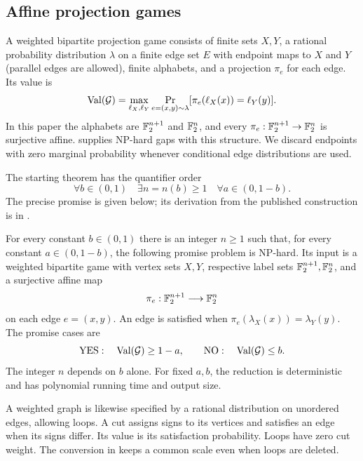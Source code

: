 \subsection{Affine projection games}

A weighted bipartite projection game consists of finite sets $X,Y$, a
rational probability distribution $\lambda$ on a finite edge set
$E$ with endpoint maps to $X$ and $Y$ (parallel edges are allowed), finite alphabets,
and a projection $\pi_e$ for each edge. Its value is
\[
 \operatorname{Val}(\mathcal G)=
 \max_{\ell_X,\ell_Y}\Pr_{e=(x,y)\sim\lambda}
 [\pi_e(\ell_X(x))=\ell_Y(y)].
\]
In this paper the alphabets are $\mathbb F_2^{n+1}$ and $\mathbb F_2^n$, and every
$\pi_e:\mathbb F_2^{n+1}\to\mathbb F_2^n$ is surjective affine.
 supplies NP-hard gaps with this structure.
We discard endpoints with zero marginal probability whenever conditional
edge distributions are used.

The starting theorem has the quantifier order
\[
 \forall b\in(0,1)\quad \exists n=n(b)\ge1\quad
 \forall a\in(0,1-b).
\]
The precise promise is given below; its derivation from
the published construction is in .

\begin{proposition}
\label{prop:affine-games}
For every constant $b\in(0,1)$ there is an integer $n\geq 1$ such that,
for every constant $a\in(0,1-b)$, the following promise problem is NP-hard.
Its input is a
weighted bipartite game with vertex sets $X,Y$, respective label sets
$\mathbb F_2^{n+1},\mathbb F_2^n$, and a surjective affine map
\[
  \pi_e:\mathbb F_2^{n+1}\longrightarrow\mathbb F_2^n
\]
on each edge $e=(x,y)$.  An edge is satisfied when
$\pi_e(\lambda_X(x))=\lambda_Y(y)$.  The promise cases are
\[
  \mathrm{YES}:\quad \operatorname{Val}(\mathcal G)\geq 1-a,
  \qquad
  \mathrm{NO}:\quad \operatorname{Val}(\mathcal G)\leq b.
\]
The integer $n$ depends on $b$ alone.  For fixed $a,b$, the reduction is
deterministic and has polynomial running time and output size.
\end{proposition}

A weighted graph is likewise specified by a rational distribution on
unordered edges, allowing loops. A cut assigns signs to its vertices and
satisfies an edge when its signs differ. Its value is its satisfaction
probability. Loops have zero cut weight. The conversion in
 keeps a common scale even when loops are deleted.
